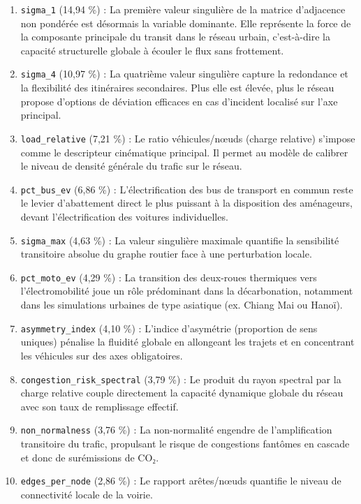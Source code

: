 \documentclass[10pt, a4paper]{article}
\providecommand{\tightlist}{}
\begin{document}
\begin{enumerate}
\def\labelenumi{\arabic{enumi}.}
\tightlist
\item
  \texttt{sigma\_1} (14,94 \%) : La première valeur singulière de la
  matrice d'adjacence non pondérée est désormais la variable dominante.
  Elle représente la force de la composante principale du transit dans
  le réseau urbain, c'est-à-dire la capacité structurelle globale à
  écouler le flux sans frottement.
\item
  \texttt{sigma\_4} (10,97 \%) : La quatrième valeur singulière capture
  la redondance et la flexibilité des itinéraires secondaires. Plus elle
  est élevée, plus le réseau propose d'options de déviation efficaces en
  cas d'incident localisé sur l'axe principal.
\item
  \texttt{load\_relative} (7,21 \%) : Le ratio véhicules/nœuds (charge
  relative) s'impose comme le descripteur cinématique principal. Il
  permet au modèle de calibrer le niveau de densité générale du trafic
  sur le réseau.
\item
  \texttt{pct\_bus\_ev} (6,86 \%) : L'électrification des bus de
  transport en commun reste le levier d'abattement direct le plus
  puissant à la disposition des aménageurs, devant l'électrification des
  voitures individuelles.
\item
  \texttt{sigma\_max} (4,63 \%) : La valeur singulière maximale
  quantifie la sensibilité transitoire absolue du graphe routier face à
  une perturbation locale.
\item
  \texttt{pct\_moto\_ev} (4,29 \%) : La transition des deux-roues
  thermiques vers l'électromobilité joue un rôle prédominant dans la
  décarbonation, notamment dans les simulations urbaines de type
  asiatique (ex. Chiang Mai ou Hanoï).
\item
  \texttt{asymmetry\_index} (4,10 \%) : L'indice d'asymétrie (proportion
  de sens uniques) pénalise la fluidité globale en allongeant les
  trajets et en concentrant les véhicules sur des axes obligatoires.
\item
  \texttt{congestion\_risk\_spectral} (3,79 \%) : Le produit du rayon
  spectral par la charge relative couple directement la capacité
  dynamique globale du réseau avec son taux de remplissage effectif.
\item
  \texttt{non\_normalness} (3,76 \%) : La non-normalité engendre de
  l'amplification transitoire du trafic, propulsant le risque de
  congestions fantômes en cascade et donc de surémissions de CO₂.
\item
  \texttt{edges\_per\_node} (2,86 \%) : Le rapport arêtes/nœuds
  quantifie le niveau de connectivité locale de la voirie.
\end{enumerate}
\end{document}
